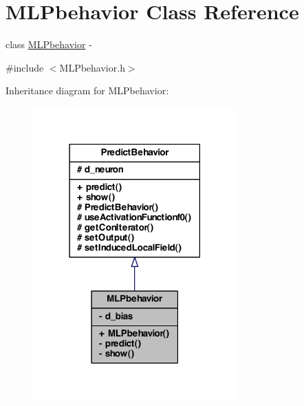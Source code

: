 \hypertarget{class_m_l_pbehavior}{
\section{MLPbehavior Class Reference}
\label{class_m_l_pbehavior}
}


class \hyperlink{class_m_l_pbehavior}{MLPbehavior} -\/  




{\ttfamily \#include $<$MLPbehavior.h$>$}



Inheritance diagram for MLPbehavior:\nopagebreak
\begin{figure}[H]
\begin{center}
\leavevmode
\includegraphics[width=222pt]{class_m_l_pbehavior__inherit__graph}
\end{center}
\end{figure}



